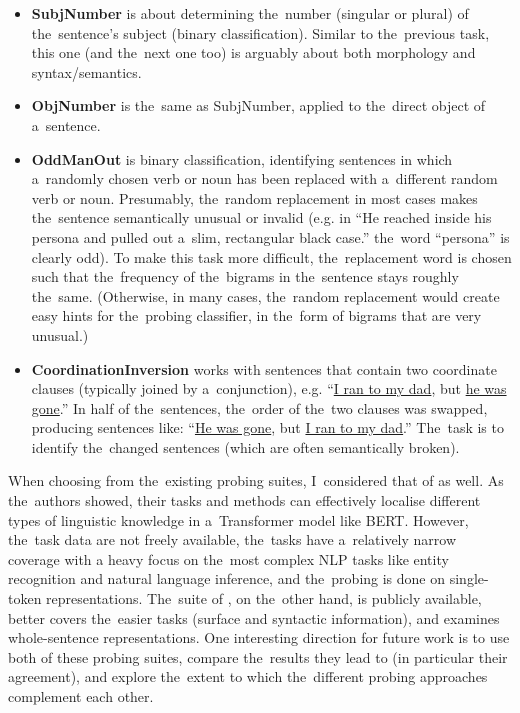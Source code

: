 \documentclass[bsc,frontabs,singlespacing,parskip,deptreport]{infthesis}
\begin{document}
{{\begin{enumerate}
{\begin{itemize}
          \item \textbf{SubjNumber} is about determining the~number (singular or plural) of the~sentence's subject (binary classification). Similar to the~previous task, this one (and the~next one too) is arguably about both morphology and syntax/semantics.
          \item \textbf{ObjNumber} is the~same as SubjNumber, applied to the~direct object of a~sentence.
          \item \textbf{OddManOut} is binary classification, identifying sentences in which a~randomly chosen verb or noun has been replaced with a~different random verb or noun. Presumably, the~random replacement in most cases makes the~sentence semantically unusual or invalid (e.g. in ``He reached inside his persona and pulled out a~slim, rectangular black case.'' the~word ``persona'' is clearly odd). To make this task more difficult, the~replacement word is chosen such that the~frequency of the~bigrams in the~sentence stays roughly the~same. (Otherwise, in many cases, the~random replacement would create easy hints for the~probing classifier, in the~form of bigrams that are very unusual.)
          \item \textbf{CoordinationInversion} works with sentences that contain two coordinate clauses (typically joined by a~conjunction), e.g. ``\underline{I ran to my dad}, but \underline{he was gone}.'' In half of the~sentences, the~order of the~two clauses was swapped, producing sentences like: ``\underline{He was gone}, but \underline{I ran to my dad}.'' The~task is to identify the~changed sentences (which are often semantically broken).
        \end{itemize}
      }
    \end{enumerate}

    When choosing from the~existing probing suites, I~considered that of \citet{Tenney_2019b} as well. As the~authors showed, their tasks and methods can effectively localise different types of linguistic knowledge in a~Transformer model like BERT.
    However, the~task data are not freely available, the~tasks have a~relatively narrow coverage with a heavy focus on the~most complex NLP tasks like entity recognition and natural language inference, and the~probing is done on single-token representations.
    The~suite of \citeauthor{Conneau_2018}, on the~other hand, is publicly available, better covers the~easier tasks (surface and syntactic information), and examines whole-sentence representations.
    One interesting direction for future work is to use both of these probing suites, compare the~results they lead to (in particular their agreement), and explore the~extent to which the~different probing approaches complement each other.
  }

}
\end{document}
